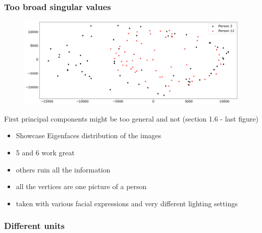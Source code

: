 \subsubsection{Too broad singular values}

\begin{center}
    \begin{figure}[h]
      \centering
      \includegraphics[width=0.94\linewidth]{external_content/media/choice_of_pc/p3_12-pc1_2-centered.png}
      \captionsetup{justification=centering}
    \end{figure}
\end{center}

First principal components might be too general and not \cite{brunton2019data} (section 1.6 - last figure)

\begin{itemize}
	\item Showcase Eigenfaces distribution of the images
	\item 5 and 6 work great
	\item others ruin all the information
	\item all the vertices are one picture of a person
	\item taken with various facial expressions and very different lighting settings
\end{itemize}


\clearpage





\subsubsection{Different units}

